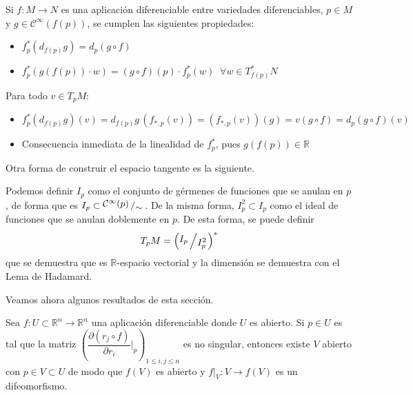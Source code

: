 \begin{prop}
Si $f:M\to N$ es una aplicación diferenciable entre variedades diferenciables, $p \in M$ y $g \in \mathcal{C}^{\infty}(f(p))$, se cumplen las siguientes propiedades:
\begin{itemize}
    \item $f^*_p(d_{f(p)}g) = d_p(g \circ f)$
    \item $f^*_p(g(f(p))\cdot w) = (g \circ f)(p) \cdot f_p^*(w) \;\;\forall w \in T^*_{f(p)}N$
\end{itemize}
\begin{demx}
Para todo $v \in T_pM$:
\begin{itemize}
    \item $f^*_p(d_{f(p)}g)(v)=d_{f(p)}g\,(f_{*,p}(v)) = (f_{*,p}(v))(g) = v(g \circ f) = d_p(g \circ f)(v)$
    \item Consecuencia inmediata de la linealidad de $f^*_p$, pues $g(f(p)) \in \mathbb{R}$
\end{itemize}
\end{demx}
\end{prop}
\begin{nota} Otra forma de construir el espacio tangente es la siguiente.

Podemos definir $I_p$ como el conjunto de g\'ermenes de funciones que se anulan en $p$, de forma que es $I_p \subset \modulo{\mathcal{C}^{\infty}(p)}{\sim}$. De la misma forma, $I_p^2 \subset I_p$ como el ideal de funciones que se anulan doblemente en $p$. De esta forma, se puede definir
$$T_pM=\left( \modulo{I_p}{I_p^2}\right)^*$$
que se demuestra que es $\mathbb R$-espacio vectorial y la dimensi\'on se demuestra con el Lema de Hadamard.
\end{nota}

Veamos ahora algunos resultados de esta secci\'on.

\begin{teo} 
Sea $f: U \subset \mathbb{R}^n \to \mathbb{R}^n$ una aplicación diferenciable donde $U$ es abierto. Si $p \in U$ es tal que la matriz $\left(\dfrac{\partial(r_j \circ f)}{\partial r_i}\Big|_p \right)_{1\leq i,j\leq n}$ es no singular, entonces existe $V$ abierto con $p \in V \subset U$ de modo que $f(V)$ es abierto y $f|_V : V \to f(V)$ es un difeomorfismo.
\end{teo}

